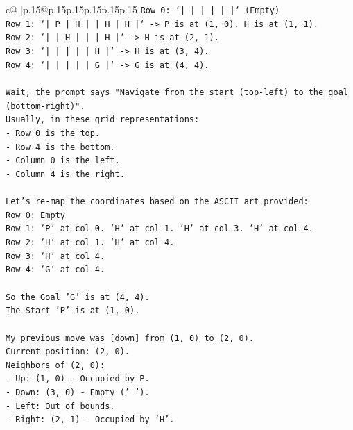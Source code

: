 \documentclass{article}
\begin{document}
{\begin{supertabular}{c@{$\;$}|p{.15\linewidth}@{}p{.15\linewidth}p{.15\linewidth}p{.15\linewidth}p{.15\linewidth}p{.15\linewidth}}
{{{\texttt{Row 0: `|     |     |     |     |     |` (Empty)} \\
\texttt{Row 1: `|  P  |  H  |     |  H  |  H  |` {-}> P is at (1, 0). H is at (1, 1).} \\
\texttt{Row 2: `|     |  H  |     |     |  H  |` {-}> H is at (2, 1).} \\
\texttt{Row 3: `|     |     |     |     |  H  |` {-}> H is at (3, 4).} \\
\texttt{Row 4: `|     |     |     |     |  G  |` {-}> G is at (4, 4).} \\
\\ 
\texttt{Wait, the prompt says "Navigate from the start (top{-}left) to the goal (bottom{-}right)".} \\
\texttt{Usually, in these grid representations:} \\
\texttt{{-} Row 0 is the top.} \\
\texttt{{-} Row 4 is the bottom.} \\
\texttt{{-} Column 0 is the left.} \\
\texttt{{-} Column 4 is the right.} \\
\\ 
\texttt{Let's re{-}map the coordinates based on the ASCII art provided:} \\
\texttt{Row 0: Empty} \\
\texttt{Row 1: `P` at col 0. `H` at col 1. `H` at col 3. `H` at col 4.} \\
\texttt{Row 2: `H` at col 1. `H` at col 4.} \\
\texttt{Row 3: `H` at col 4.} \\
\texttt{Row 4: `G` at col 4.} \\
\\ 
\texttt{So the Goal 'G' is at (4, 4).} \\
\texttt{The Start 'P' is at (1, 0).} \\
\\ 
\texttt{My previous move was {[}down{]} from (1, 0) to (2, 0).} \\
\texttt{Current position: (2, 0).} \\
\texttt{Neighbors of (2, 0):} \\
\texttt{{-} Up: (1, 0) {-} Occupied by P.} \\
\texttt{{-} Down: (3, 0) {-} Empty (' ').} \\
\texttt{{-} Left: Out of bounds.} \\
\texttt{{-} Right: (2, 1) {-} Occupied by 'H'.} \\
\\ 
}}}
\end{supertabular}}
\end{document}
